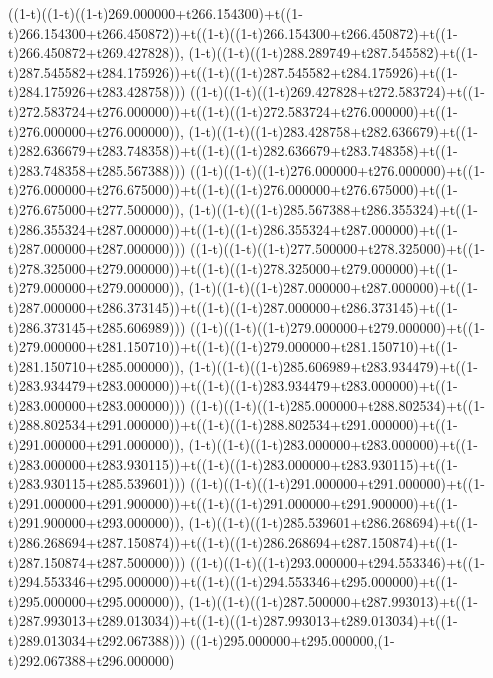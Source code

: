 ((1-t)((1-t)((1-t)269.000000+t266.154300)+t((1-t)266.154300+t266.450872))+t((1-t)((1-t)266.154300+t266.450872)+t((1-t)266.450872+t269.427828)),                                     (1-t)((1-t)((1-t)288.289749+t287.545582)+t((1-t)287.545582+t284.175926))+t((1-t)((1-t)287.545582+t284.175926)+t((1-t)284.175926+t283.428758)))
((1-t)((1-t)((1-t)269.427828+t272.583724)+t((1-t)272.583724+t276.000000))+t((1-t)((1-t)272.583724+t276.000000)+t((1-t)276.000000+t276.000000)),                                     (1-t)((1-t)((1-t)283.428758+t282.636679)+t((1-t)282.636679+t283.748358))+t((1-t)((1-t)282.636679+t283.748358)+t((1-t)283.748358+t285.567388)))
((1-t)((1-t)((1-t)276.000000+t276.000000)+t((1-t)276.000000+t276.675000))+t((1-t)((1-t)276.000000+t276.675000)+t((1-t)276.675000+t277.500000)),                                     (1-t)((1-t)((1-t)285.567388+t286.355324)+t((1-t)286.355324+t287.000000))+t((1-t)((1-t)286.355324+t287.000000)+t((1-t)287.000000+t287.000000)))
((1-t)((1-t)((1-t)277.500000+t278.325000)+t((1-t)278.325000+t279.000000))+t((1-t)((1-t)278.325000+t279.000000)+t((1-t)279.000000+t279.000000)),                                     (1-t)((1-t)((1-t)287.000000+t287.000000)+t((1-t)287.000000+t286.373145))+t((1-t)((1-t)287.000000+t286.373145)+t((1-t)286.373145+t285.606989)))
((1-t)((1-t)((1-t)279.000000+t279.000000)+t((1-t)279.000000+t281.150710))+t((1-t)((1-t)279.000000+t281.150710)+t((1-t)281.150710+t285.000000)),                                     (1-t)((1-t)((1-t)285.606989+t283.934479)+t((1-t)283.934479+t283.000000))+t((1-t)((1-t)283.934479+t283.000000)+t((1-t)283.000000+t283.000000)))
((1-t)((1-t)((1-t)285.000000+t288.802534)+t((1-t)288.802534+t291.000000))+t((1-t)((1-t)288.802534+t291.000000)+t((1-t)291.000000+t291.000000)),                                     (1-t)((1-t)((1-t)283.000000+t283.000000)+t((1-t)283.000000+t283.930115))+t((1-t)((1-t)283.000000+t283.930115)+t((1-t)283.930115+t285.539601)))
((1-t)((1-t)((1-t)291.000000+t291.000000)+t((1-t)291.000000+t291.900000))+t((1-t)((1-t)291.000000+t291.900000)+t((1-t)291.900000+t293.000000)),                                     (1-t)((1-t)((1-t)285.539601+t286.268694)+t((1-t)286.268694+t287.150874))+t((1-t)((1-t)286.268694+t287.150874)+t((1-t)287.150874+t287.500000)))
((1-t)((1-t)((1-t)293.000000+t294.553346)+t((1-t)294.553346+t295.000000))+t((1-t)((1-t)294.553346+t295.000000)+t((1-t)295.000000+t295.000000)),                                     (1-t)((1-t)((1-t)287.500000+t287.993013)+t((1-t)287.993013+t289.013034))+t((1-t)((1-t)287.993013+t289.013034)+t((1-t)289.013034+t292.067388)))
((1-t)295.000000+t295.000000,(1-t)292.067388+t296.000000)
